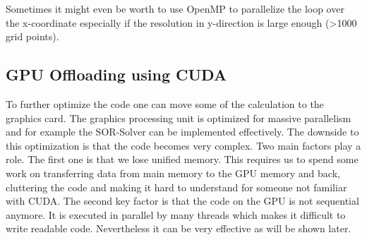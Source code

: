 \documentclass[master.tex]{subfiles}
\begin{document}
Sometimes it might even be worth to use OpenMP to parallelize the loop over the x-coordinate especially if the resolution in y-direction is large enough (\textgreater 1000 grid points).

\subsection{GPU Offloading using CUDA}
To further optimize the code one can move some of the calculation to the graphics card. The graphics processing unit is optimized for massive parallelism and for example the SOR-Solver can be implemented effectively. The downside to this optimization is that the code becomes very complex. Two main factors play a role. The first one is that we lose unified memory. This requires us to spend some work on transferring data from main memory to the GPU memory and back, cluttering the code and making it hard to understand for someone not familiar with CUDA. The second key factor is that the code on the GPU is not sequential anymore. It is executed in parallel by many threads which makes it difficult to write readable code.\newline
Nevertheless it can be very effective as will be shown later.
\end{document}
